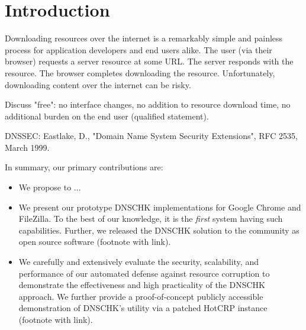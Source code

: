 \section{Introduction} \label{sec:introduction}

Downloading resources over the internet is a remarkably simple and painless
process for application developers and end users alike. The user (via their
browser) requests a server resource at some URL. The server responds with the
resource. The browser completes downloading the resource. Unfortunately,
downloading content over the internet can be risky.


Discuss "free": no interface changes, no addition to resource download
time, no additional burden on the end user (qualified statement).

DNSSEC: Eastlake, D., "Domain Name System Security Extensions", RFC 2535, March
1999.

In summary, our primary contributions are:

\begin{itemize}

  \item We propose to  ...

  \item We present our prototype DNSCHK implementations for Google Chrome and
  FileZilla. To the best of our knowledge, it is the \emph{first} system having
  such capabilities. Further, we released the DNSCHK solution to the community
  as open source software (footnote with link).

  \item We carefully and extensively evaluate the security, scalability, and
  performance of our automated defense against resource corruption to
  demonstrate the effectiveness and high practicality of the DNSCHK approach. We
  further provide a proof-of-concept publicly accessible demonstration of
  DNSCHK's utility via a patched HotCRP instance (footnote with link).

\end{itemize}
